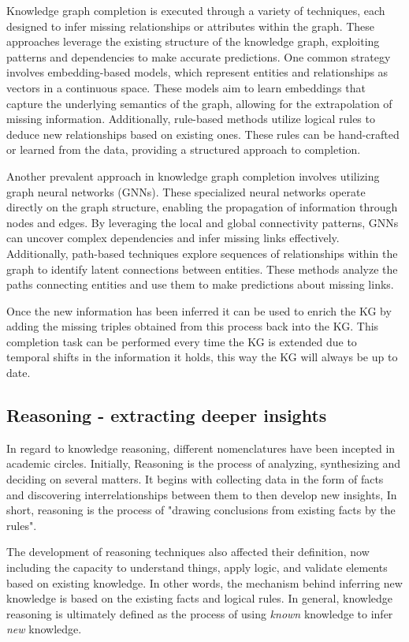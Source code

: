 Knowledge graph completion is executed through a variety of techniques, each designed to infer missing relationships or attributes within the graph. These approaches leverage the existing structure of the knowledge graph, exploiting patterns and dependencies to make accurate predictions. One common strategy involves embedding-based models, which represent entities and relationships as vectors in a continuous space. These models aim to learn embeddings that capture the underlying semantics of the graph, allowing for the extrapolation of missing information. Additionally, rule-based methods utilize logical rules to deduce new relationships based on existing ones. These rules can be hand-crafted or learned from the data, providing a structured approach to completion.

Another prevalent approach in knowledge graph completion involves utilizing graph neural networks (GNNs). These specialized neural networks operate directly on the graph structure, enabling the propagation of information through nodes and edges. By leveraging the local and global connectivity patterns, GNNs can uncover complex dependencies and infer missing links effectively. Additionally, path-based techniques explore sequences of relationships within the graph to identify latent connections between entities. These methods analyze the paths connecting entities and use them to make predictions about missing links.

Once the new information has been inferred it can be used to enrich the KG by adding the missing triples obtained from this process back into the KG. This completion task can be performed every time the KG is extended due to temporal shifts in the information it holds, this way the KG will always be up to date.

\subsection{Reasoning - extracting deeper insights}

In regard to knowledge reasoning, different nomenclatures have been incepted in academic circles. Initially, Reasoning is the process of analyzing, synthesizing and deciding on several matters. It begins with collecting data in the form of facts and discovering interrelationships between them to then develop new insights, In short, reasoning is the process of "drawing conclusions from existing facts by the rules"\cite{sutton2018reinforcement}.

The development of reasoning techniques also affected their definition, now including the capacity to understand things, apply logic, and validate elements based on existing knowledge. In other words, the mechanism behind inferring new knowledge is based on the existing facts and logical rules. In general, knowledge reasoning is ultimately defined as the process of using \textit{known} knowledge to infer \textit{new} knowledge.

